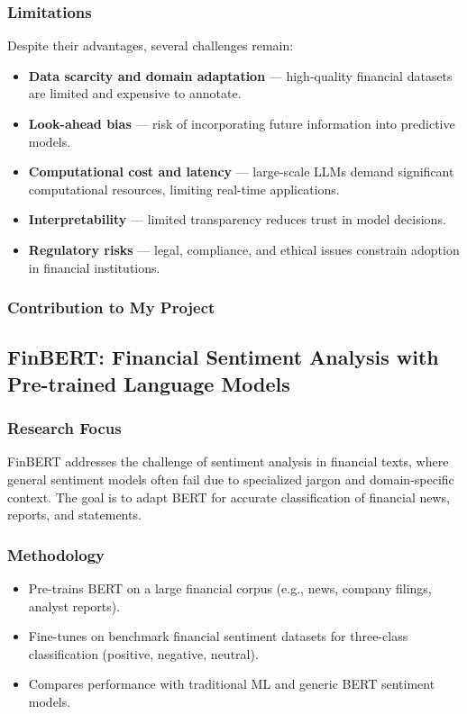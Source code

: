 \documentclass[12pt,a4paper]{report}
\begin{document}
\subsubsection{Limitations}
Despite their advantages, several challenges remain:
\begin{itemize}
    \item \textbf{Data scarcity and domain adaptation} — high-quality financial datasets are limited and expensive to annotate.
    \item \textbf{Look-ahead bias} — risk of incorporating future information into predictive models.
    \item \textbf{Computational cost and latency} — large-scale LLMs demand significant computational resources, limiting real-time applications.
    \item \textbf{Interpretability} — limited transparency reduces trust in model decisions.
    \item \textbf{Regulatory risks} — legal, compliance, and ethical issues constrain adoption in financial institutions.
\end{itemize}

\subsubsection{Contribution to My Project}


\subsection{FinBERT: Financial Sentiment Analysis with Pre-trained Language Models \cite{araci2019finbert}}

\subsubsection{Research Focus}
FinBERT addresses the challenge of sentiment analysis in financial texts, where general sentiment models often fail due to specialized jargon and domain-specific context.  
The goal is to adapt BERT for accurate classification of financial news, reports, and statements.

\subsubsection{Methodology}
\begin{itemize}
    \item Pre-trains BERT on a large financial corpus (e.g., news, company filings, analyst reports).
    \item Fine-tunes on benchmark financial sentiment datasets for three-class classification (positive, negative, neutral).
    \item Compares performance with traditional ML and generic BERT sentiment models.
\end{itemize}
\end{document}
